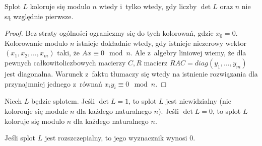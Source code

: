 

\begin{proposition}
    \label{prp:colour_det}
    Splot $L$ koloruje się modulo $n$ wtedy i~tylko wtedy, gdy liczby $\det L$ oraz $n$ nie są względnie pierwsze.
\end{proposition}

\begin{proof}
    Bez straty ogólności ograniczmy się do tych kolorowań, gdzie $x_0 = 0$.
    Kolorowanie modulo $n$ istnieje dokładnie wtedy, gdy istnieje niezerowy wektor $(x_1, x_2, \ldots, x_m)$ taki, że $Ax \equiv 0 \mod n$.
    Ale z~algebry liniowej wiemy, że dla pewnych całkowitoliczbowych macierzy $C, R$ macierz $RAC = diag(y_1, \ldots, y_m)$ jest diagonalna.
    Warunek z~faktu tłumaczy się wtedy na istnienie rozwiązania dla przynajmniej jednego z~równań $x_iy_i \equiv 0 \mod n$.
\end{proof}

\begin{corollary}
    Niech $L$ będzie splotem.
    Jeśli $\det L = 1$, to splot $L$ jest niewidzialny (nie kolorouje się module $n$ dla każdego naturalnego $n$).
    Jeśli $\det L = 0$, to splot $L$ koloruje się modulo $n$ dla każdego naturalnego $n$.
\end{corollary}

\begin{corollary}
    Jeśli splot $L$ jest rozszczepialny, to jego wyznacznik wynosi $0$.
\end{corollary}

